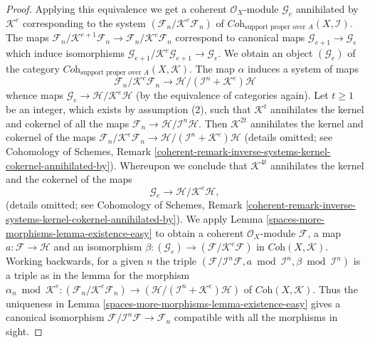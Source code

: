 \begin{proof}
\medskip\noindent
Applying this equivalence we get a coherent $\mathcal{O}_X$-module
$\mathcal{G}_e$ annihilated by $\mathcal{K}^e$ corresponding to the system
$(\mathcal{F}_n/\mathcal{K}^e\mathcal{F}_n)$ of
$\textit{Coh}_{\text{support proper over } A}(X, \mathcal{I})$. The maps
$\mathcal{F}_n/\mathcal{K}^{e + 1}\mathcal{F}_n \to
\mathcal{F}_n/\mathcal{K}^e\mathcal{F}_n$ correspond to canonical maps
$\mathcal{G}_{e + 1} \to \mathcal{G}_e$ which induce isomorphisms
$\mathcal{G}_{e + 1}/\mathcal{K}^e\mathcal{G}_{e + 1} \to \mathcal{G}_e$.
We obtain an object $(\mathcal{G}_e)$ of the category
$\textit{Coh}_{\text{support proper over } A}(X, \mathcal{K})$.
The map $\alpha$ induces a system of maps
$$
\mathcal{F}_n/\mathcal{K}^e\mathcal{F}_n
\longrightarrow
\mathcal{H}/(\mathcal{I}^n + \mathcal{K}^e)\mathcal{H}
$$
whence maps $\mathcal{G}_e \to \mathcal{H}/\mathcal{K}^e\mathcal{H}$
(by the equivalence of categories again).
Let $t \geq 1$ be an integer, which exists by assumption (2),
such that $\mathcal{K}^t$ annihilates the kernel and cokernel of all the maps
$\mathcal{F}_n \to \mathcal{H}/\mathcal{I}^n\mathcal{H}$.
Then $\mathcal{K}^{2t}$ annihilates the kernel and cokernel of the maps
$\mathcal{F}_n/\mathcal{K}^e\mathcal{F}_n \to
\mathcal{H}/(\mathcal{I}^n + \mathcal{K}^e)\mathcal{H}$
(details omitted; see Cohomology of Schemes,
Remark \ref{coherent-remark-inverse-systems-kernel-cokernel-annihilated-by}).
Whereupon we conclude that $\mathcal{K}^{4t}$ annihilates the kernel and
the cokernel of the maps
$$
\mathcal{G}_e
\longrightarrow
\mathcal{H}/\mathcal{K}^e\mathcal{H},
$$
(details omitted;  see Cohomology of Schemes,
Remark \ref{coherent-remark-inverse-systems-kernel-cokernel-annihilated-by}).
We apply Lemma \ref{spaces-more-morphisms-lemma-existence-easy} to obtain a coherent
$\mathcal{O}_X$-module $\mathcal{F}$, a map
$a : \mathcal{F} \to \mathcal{H}$ and an isomorphism
$\beta : (\mathcal{G}_e) \to (\mathcal{F}/\mathcal{K}^e\mathcal{F})$
in $\textit{Coh}(X, \mathcal{K})$. Working backwards, for a given $n$
the triple
$(\mathcal{F}/\mathcal{I}^n\mathcal{F}, a \bmod \mathcal{I}^n, \beta
\bmod \mathcal{I}^n)$ is a triple as in the lemma for the morphism
$\alpha_n \bmod \mathcal{K}^e :
(\mathcal{F}_n/\mathcal{K}^e\mathcal{F}_n) \to
(\mathcal{H}/(\mathcal{I}^n + \mathcal{K}^e)\mathcal{H})$
of $\textit{Coh}(X, \mathcal{K})$. Thus the uniqueness in
Lemma \ref{spaces-more-morphisms-lemma-existence-easy}
gives a canonical isomorphism
$\mathcal{F}/\mathcal{I}^n\mathcal{F} \to \mathcal{F}_n$
compatible with all the morphisms in sight.


\end{proof}
